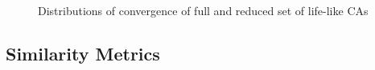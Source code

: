 \begin{figure}[!h]
\centering
            \hfill
            \hfill
            \caption{Distributions of convergence of full and reduced set of life-like CAs}
\label{fig:taxonomy-dist}
\end{figure}

\subsection{Similarity Metrics}

